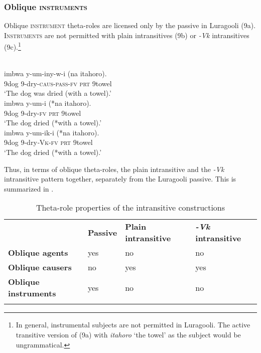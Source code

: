\documentclass[output=paper]{langsci/langscibook}
\begin{document}
\subsubsection{Oblique \textsc{instruments}}

Oblique \textsc{instrument} theta-roles are licensed only by the passive in Luragooli (9a). \textsc{Instruments} are not permitted with plain intransitives (9b) or \textit{-Vk} intransitives (9c).\footnote{ In general, instrumental subjects are not permitted in Luragooli. The active transitive version of (9a) with \textit{itahoro} ‘the towel’ as the subject would be ungrammatical.}

\ea\label{exx:}
\ea
{}\\
\gll imbwa y-um-iny-w-i            (na    itahoro).\\
     9dog 9-dry-\textsc{caus}-\textsc{pass}-\textsc{fv}   \textsc{prt}  9towel\\
\glt ‘The dog was dried (with a towel).’
\ex
{}\\
\gll imbwa y-um-i          (*na   itahoro).\\
     9dog   9-dry-\textsc{fv}         \textsc{prt} 9towel\\
\glt ‘The dog dried (*with a towel).’
\ex
{}\\
\gll imbwa  y-um-ik-i      (*na  itahoro).\\
     9dog    9-dry\textit{-}\textsc{Vk}-\textsc{fv} \textsc{prt} 9towel\\
\glt ‘The dog dried (*with a towel).’
\z
\z

Thus, in terms of oblique theta-roles, the plain intransitive and the \textit{-Vk} intransitive pattern together, separately from the Luragooli passive. This is summarized in .

\begin{table}
\caption{Theta-role properties of the intransitive constructions}
\label{tab:2}

\begin{tabularx}{\textwidth}{XXXX} & \textbf{Passive} & \textbf{Plain intransitive} & \textbf{\textit{-Vk }}\textbf{intransitive}\\
\lsptoprule
\textbf{Oblique agents} & yes & no & no\\
\textbf{Oblique causers} & no & yes & yes\\
\textbf{Oblique instruments} & yes & no & no\\
\lspbottomrule
\end{tabularx}
\end{table}
\end{document}
